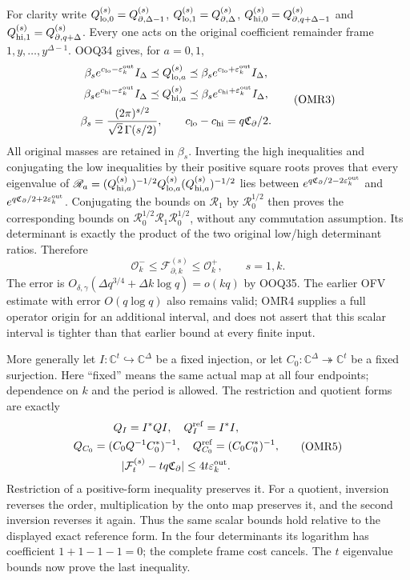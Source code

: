 \documentclass[11pt,a4paper]{article}
\begin{document}
For clarity write $Q_{{\rm lo},0}^{(s)}=Q_{\partial,\Delta-1}^{(s)}$,
$Q_{{\rm lo},1}^{(s)}=Q_{\partial,\Delta}^{(s)}$,
$Q_{{\rm hi},0}^{(s)}=Q_{\partial,q+\Delta-1}^{(s)}$ and
$Q_{{\rm hi},1}^{(s)}=Q_{\partial,q+\Delta}^{(s)}$.
Every one acts on the original coefficient remainder frame
$1,y,\ldots,y^{\Delta-1}$. OOQ34 gives, for $a=0,1$,
\[
 \begin{gathered}
 \beta_s e^{c_{\rm lo}-\varepsilon_k^{\rm out}}I_\Delta
 \preceq Q_{{\rm lo},a}^{(s)}
 \preceq\beta_s e^{c_{\rm lo}+\varepsilon_k^{\rm out}}I_\Delta,\\
 \beta_s e^{c_{\rm hi}-\varepsilon_k^{\rm out}}I_\Delta
 \preceq Q_{{\rm hi},a}^{(s)}
 \preceq\beta_s e^{c_{\rm hi}+\varepsilon_k^{\rm out}}I_\Delta,\\
 \beta_s=\frac{(2\pi)^{s/2}}{\sqrt2\,\Gamma(s/2)},\qquad
 c_{\rm lo}-c_{\rm hi}=q\mathfrak C_\partial/2.
 \end{gathered}\tag{OMR3}
\]
All original masses are retained in $\beta_s$. Inverting the high
inequalities and conjugating the low inequalities by their positive
square roots proves that every eigenvalue of
$\mathscr R_a=(Q_{{\rm hi},a}^{(s)})^{-1/2}
Q_{{\rm lo},a}^{(s)}(Q_{{\rm hi},a}^{(s)})^{-1/2}$ lies between
$e^{q\mathfrak C_\partial/2-2\varepsilon_k^{\rm out}}$ and
$e^{q\mathfrak C_\partial/2+2\varepsilon_k^{\rm out}}$.
Conjugating the bounds on $\mathscr R_1$ by $\mathscr R_0^{1/2}$
then proves the corresponding bounds on
$\mathscr R_0^{1/2}\mathscr R_1\mathscr R_0^{1/2}$, without any
commutation assumption. Its determinant is exactly the product
of the two original low/high determinant ratios. Therefore
\[
 \mathcal O_k^-\le\mathcal F_{\partial,k}^{(s)}
                      \le\mathcal O_k^+,\qquad s=1,k.
 \tag{OMR4}
\]
The error is $O_{\delta,\gamma}(\Delta q^{3/4}+\Delta k\log q)
=o(kq)$ by OOQ35. The earlier OFV estimate with error $O(q\log q)$
also remains valid; OMR4 supplies a full operator origin for an
additional interval, and does not assert that this scalar interval
is tighter than that earlier bound at every finite input.

More generally let $I:\mathbb C^t\hookrightarrow\mathbb C^\Delta$
be a fixed injection, or let $C_0:\mathbb C^\Delta\twoheadrightarrow
\mathbb C^t$ be a fixed surjection. Here ``fixed'' means the same
actual map at all four endpoints; dependence on $k$ and the period
is allowed. The restriction and quotient forms are exactly
\[
\begin{gathered}
 Q_I=I^*QI,\quad Q_I^{\rm ref}=I^*I,\\
 Q_{C_0}=(C_0Q^{-1}C_0^*)^{-1},\quad
 Q_{C_0}^{\rm ref}=(C_0C_0^*)^{-1},\\
 |\mathcal F_t^{(s)}-tq\mathfrak C_\partial|
          \le4t\varepsilon_k^{\rm out}.
\end{gathered}\tag{OMR5}
\]
Restriction of a positive-form inequality preserves it. For a
quotient, inversion reverses the order, multiplication by the onto
map preserves it, and the second inversion reverses it again.
Thus the same scalar bounds hold relative to the displayed exact
reference form. In the four determinants its logarithm has
coefficient $1+1-1-1=0$; the complete frame cost cancels.
The $t$ eigenvalue bounds now prove the last inequality.
\end{document}
